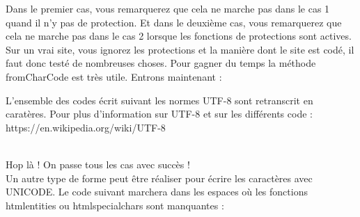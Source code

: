 \documentclass{article}
\begin{document}
Dans le premier cas, vous remarquerez que cela ne marche pas dans le cas 1 quand il n'y pas de protection. Et dans le deuxième cas, vous remarquerez que cela ne marche pas dans le cas 2 lorsque les fonctions de protections sont actives. Sur un vrai site, vous ignorez les protections et la manière dont le site est codé, il faut donc testé de nombreuses choses. Pour gagner du temps la méthode fromCharCode est très utile. Entrons maintenant :
\vspace{0.2cm}\\
\vspace{0.2cm}

L'ensemble des codes écrit suivant les normes UTF-8 sont retranscrit en caratères. Pour plus d'information sur UTF-8 et sur les différents code : https://en.wikipedia.org/wiki/UTF-8\\
\vspace{0.2cm}\\
\vspace{0.2cm}

Hop là ! On passe tous les cas avec succès !\\

Un autre type de forme peut être réaliser pour écrire les caractères avec UNICODE. Le code suivant marchera dans les espaces où les fonctions htmlentities ou htmlspecialchars sont manquantes :
\vspace{0.2cm}\\
\vspace{0.2cm}
\end{document}
